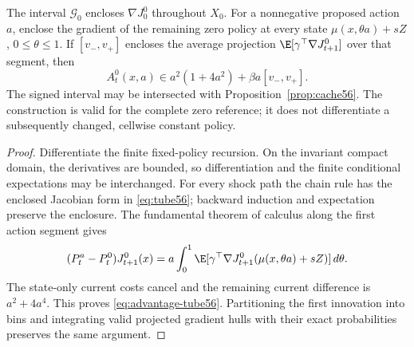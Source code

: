 \begin{proposition}\label{prop:tube56}
The interval $\mathcal G_0$ encloses $\nabla J_0^0$ throughout $X_0$. For a nonnegative proposed action $a$, enclose the gradient of the remaining zero policy at every state
$\mu(x,\theta a)+sZ$, $0\le\theta\le1$. If $[v_-,v_+]$ encloses the average projection $\E[\gamma^\top\nabla J_{t+1}^0]$ over that segment, then
\begin{equation}\label{eq:advantage-tube56}
 A_t^0(x,a)\in a^2(1+4a^2)+\beta a[v_-,v_+].
\end{equation}
The signed interval may be intersected with Proposition~\ref{prop:cache56}. The construction is valid for the complete zero reference; it does not differentiate a subsequently changed, cellwise constant policy.
\end{proposition}
\begin{proof}
Differentiate the finite fixed-policy recursion. On the invariant compact domain, the derivatives are bounded, so differentiation and the finite conditional expectations may be interchanged. For every shock path the chain rule has the enclosed Jacobian form in \eqref{eq:tube56}; backward induction and expectation preserve the enclosure. The fundamental theorem of calculus along the first action segment gives
\[
 (P_t^a-P_t^0)J_{t+1}^0(x)
 =a\int_0^1\E[\gamma^\top\nabla J_{t+1}^0(\mu(x,\theta a)+sZ)]\,d\theta.
\]
The state-only current costs cancel and the remaining current difference is $a^2+4a^4$. This proves \eqref{eq:advantage-tube56}. Partitioning the first innovation into bins and integrating valid projected gradient hulls with their exact probabilities preserves the same argument.
\end{proof}


